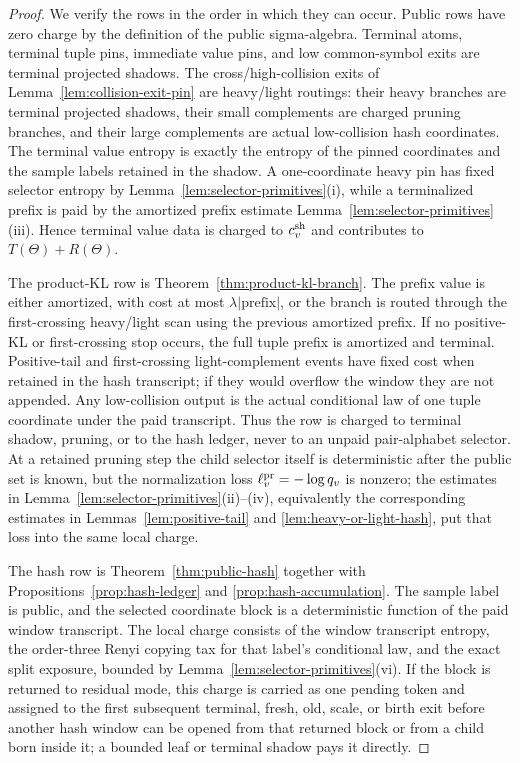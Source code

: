 \documentclass[11pt]{article}
\begin{document}
\begin{proof}
We verify the rows in the order in which they can occur.  Public rows have
zero charge by the definition of the public sigma-algebra.  Terminal atoms,
terminal tuple pins, immediate value pins, and low common-symbol exits are
terminal projected shadows.  The cross/high-collision exits of
Lemma~\ref{lem:collision-exit-pin} are heavy/light routings: their heavy
branches are terminal projected shadows, their small complements are charged
pruning branches, and their large complements are actual low-collision hash
coordinates.  The terminal value entropy is exactly the entropy of the pinned
coordinates and the sample labels retained in the shadow.  A one-coordinate
heavy pin has fixed selector entropy by Lemma~\ref{lem:selector-primitives}(i),
while a terminalized prefix is paid by the amortized prefix estimate
Lemma~\ref{lem:selector-primitives}(iii).  Hence terminal value data is
charged to $c_v^{\rm sh}$ and contributes to $T(\Theta)+R(\Theta)$.

The product-KL row is Theorem~\ref{thm:product-kl-branch}.  The prefix
value is either amortized, with cost at most $\lambda|\text{prefix}|$, or the
branch is routed through the first-crossing heavy/light scan using the previous
amortized prefix.  If no positive-KL or first-crossing stop occurs, the full
tuple prefix is amortized and terminal.  Positive-tail and first-crossing
	light-complement events have fixed cost when retained in the hash transcript;
	if they would overflow the window they are not appended.  Any
	low-collision output is the actual conditional law of one tuple coordinate
	under the paid transcript.  Thus the row is charged to terminal shadow,
	pruning, or to the hash ledger, never to an unpaid pair-alphabet selector.
	At a retained pruning step the child selector itself is deterministic after
	the public set is known, but the normalization loss
	$\ell_v^{\rm pr}=-\log q_v$ is nonzero; the estimates
	in Lemma~\ref{lem:selector-primitives}(ii)--(iv), equivalently the
	corresponding estimates in Lemmas~\ref{lem:positive-tail} and
	\ref{lem:heavy-or-light-hash}, put that loss into the same local charge.

The hash row is Theorem~\ref{thm:public-hash} together with
Propositions~\ref{prop:hash-ledger} and \ref{prop:hash-accumulation}.  The
sample label is public, and the
selected coordinate block is a deterministic function of the paid window
transcript.  The local charge consists of the window transcript entropy, the
order-three Renyi copying tax for that label's conditional law, and the exact
split exposure, bounded by Lemma~\ref{lem:selector-primitives}(vi).  If the
block is returned to residual mode, this charge is
carried as one pending token and assigned to the first subsequent terminal,
fresh, old, scale, or birth exit before another hash window can be opened from
that returned block or from a child born inside it; a bounded leaf or terminal
shadow pays it directly.


\end{proof}
\end{document}
